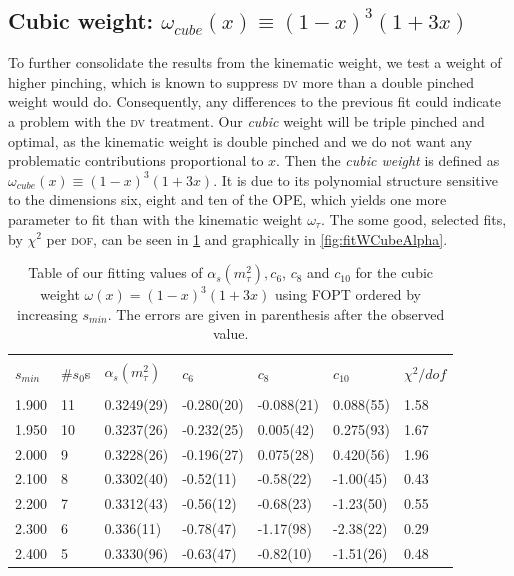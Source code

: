 \documentclass[../../index.tex]{subfiles}
\begin{document}
\subsection{Cubic weight: $\omega_{cube}(x) \equiv (1-x)^3(1+3x)$}
\label{sec:cubicWeight}
To further consolidate the results from the kinematic weight, we test
a weight of higher pinching, which is known to suppress \textsc{dv} more than a
double pinched weight would do. Consequently, any differences to the previous
fit could indicate a problem with the \textsc{dv} treatment. Our \textit{cubic}
weight will be triple pinched and optimal, as the kinematic weight is double
pinched and we do not want any problematic contributions proportional to $x$.
Then the \textit{cubic weight} is defined as $\omega_{cube}(x) \equiv
(1-x)^3(1+3x)$. It is due to its polynomial structure sensitive to the dimensions
six, eight and ten of the \textsc{OPE}, which yields one more parameter to fit
than with the kinematic weight $\omega_\tau$. The some good, selected fits, by
$\chi^2$ per \textsc{dof}, can be seen in \cref{table:fitWCubicAlD6D8D10} and
graphically in \cref{fig:fitWCubeAlpha}.
\begin{table}
  \centering
  \begin{tabular}{lllllll}
    \toprule \\
    $s_{min}$ & \#$s_0$s & $\alpha_s(m_\tau^2)$ & $c_6$ & $c_8$ & $c_{10}$ & $\chi^2/dof$  \\
    \hline \\
    1.900 & 11 & 0.3249(29) & -0.280(20) & -0.088(21) & 0.088(55) & 1.58 \\
    1.950 & 10 & 0.3237(26) & -0.232(25) & 0.005(42) & 0.275(93) & 1.67 \\
    2.000 & 9 & 0.3228(26) & -0.196(27) & 0.075(28) & 0.420(56) & 1.96 \\
    \rowcolor{primary}
    2.100 & 8 & 0.3302(40) & -0.52(11) & -0.58(22) & -1.00(45) & 0.43 \\
    \rowcolor{primary}
    2.200 & 7 & 0.3312(43) & -0.56(12) & -0.68(23) & -1.23(50) & 0.55 \\
    \rowcolor{primary}
    2.300 & 6 & 0.336(11) & -0.78(47) & -1.17(98) & -2.38(22) & 0.29 \\
    \rowcolor{primary}
    2.400 & 5 & 0.3330(96) & -0.63(47) & -0.82(10) & -1.51(26) & 0.48 \\
    \bottomrule
  \end{tabular}
  \caption{Table of our fitting values of $\alpha_s(m_\tau^2), c_6$, $c_8$ and
    $c_{10}$ for the cubic weight $\omega(x)=(1-x)^3(1+3x)$ using FOPT ordered
    by increasing $s_{min}$. The errors are given in parenthesis after the observed value.}
  \label{table:fitWCubicAlD6D8D10}
\end{table}
\end{document}
